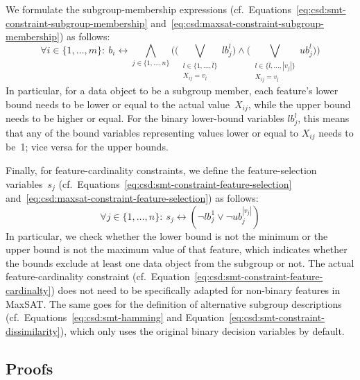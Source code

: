 \documentclass{article}
\theoremstyle{definition}
\begin{document}
We formulate the subgroup-membership expressions (cf.~Equations~\ref{eq:csd:smt-constraint-subgroup-membership} and~\ref{eq:csd:maxsat-constraint-subgroup-membership}) as follows:
%
\begin{equation}
	\forall i \in \{1, \dots, m\}:~ b_i\leftrightarrow \bigwedge_{j \in \{1, \dots, n\}} \Big( \Big( \bigvee_{\substack{l \in \{1, \dots, \bar{l}\} \\ X_{ij} = v_{\bar{l}} }} \mathit{lb}^l_j \Big) \land \Big( \bigvee_{\substack{l \in \{\bar{l}, \dots, |v_j|\} \\ X_{ij} = v_{\bar{l}} }} \mathit{ub}^l_j \Big) \Big)
	\label{eq:csd:maxsat-numeric-constraint-subgroup-membership}
\end{equation}
%
In particular, for a data object to be a subgroup member, each feature's lower bound needs to be lower or equal to the actual value~$X_{ij}$, while the upper bound needs to be higher or equal.
For the binary lower-bound variables $\mathit{lb}^l_j$, this means that any of the bound variables representing values lower or equal to $X_{ij}$ needs to be~1; vice versa for the upper bounds.

Finally, for feature-cardinality constraints, we define the feature-selection variables~$s_j$ (cf.~Equations~\ref{eq:csd:smt-constraint-feature-selection} and~\ref{eq:csd:maxsat-constraint-feature-selection}) as follows:
%
\begin{equation}
	\forall j \in \{1, \dots, n\}:~ s_j \leftrightarrow \left( \lnot \mathit{lb}^1_j \lor \lnot \mathit{ub}^{|v_j|}_j \right)
	\label{eq:csd:maxsat-numeric-constraint-feature-selection}
\end{equation}
%
In particular, we check whether the lower bound is not the minimum or the upper bound is not the maximum value of that feature, which indicates whether the bounds exclude at least one data object from the subgroup or not.
The actual feature-cardinality constraint (cf.~Equation~\ref{eq:csd:smt-constraint-feature-cardinalty}) does not need to be specifically adapted for non-binary features in MaxSAT.
The same goes for the definition of alternative subgroup descriptions (cf.~Equations~\ref{eq:csd:smt-hamming} and Equation~\ref{eq:csd:smt-constraint-dissimilarity}), which only uses the original binary decision variables by default.

\subsection{Proofs}
\label{sec:csd:appendix:proofs}
\end{document}
